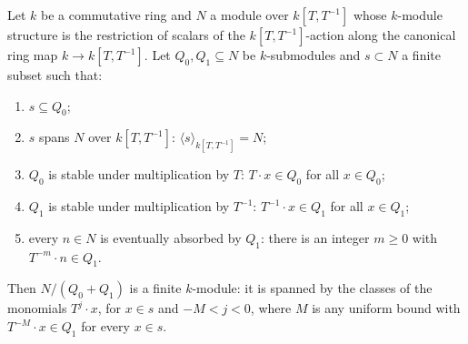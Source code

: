 \begin{theorem}
  \label{pa-thm:two_lattice_span}
  \leanok

  Let \(k\) be a commutative ring and \(N\) a module over \(k[T,T^{-1}]\) whose
  \(k\)-module structure is the restriction of scalars of the \(k[T,T^{-1}]\)-action along the
  canonical ring map \(k \to k[T,T^{-1}]\). Let \(Q_0, Q_1 \subseteq N\) be \(k\)-submodules
  and \(s \subset N\) a finite subset such that:
  \begin{enumerate}
    \item \(s \subseteq Q_0\);
    \item \(s\) spans \(N\) over \(k[T,T^{-1}]\): \(\langle s \rangle_{k[T,T^{-1}]} = N\);
    \item \(Q_0\) is stable under multiplication by \(T\): \(T \cdot x \in Q_0\) for all
      \(x \in Q_0\);
    \item \(Q_1\) is stable under multiplication by \(T^{-1}\): \(T^{-1} \cdot x \in Q_1\) for
      all \(x \in Q_1\);
    \item every \(n \in N\) is eventually absorbed by \(Q_1\): there is an integer \(m \ge 0\)
      with \(T^{-m} \cdot n \in Q_1\).
  \end{enumerate}
  Then \(N / (Q_0 + Q_1)\) is a finite \(k\)-module: it is spanned by the classes of the
  monomials \(T^j \cdot x\), for \(x \in s\) and \(-M < j < 0\), where \(M\) is any uniform
  bound with \(T^{-M} \cdot x \in Q_1\) for every \(x \in s\).
\end{theorem}
